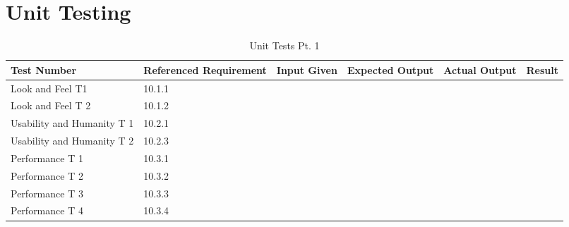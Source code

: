 \documentclass[12pt, titlepage]{article}
\begin{document}
\section{Unit Testing}
\noindent
{}

\begin{table}[!h]
\caption{Unit Tests Pt. 1}
\begin{adjustwidth}{-2cm}{-2cm}
\begin{tabularx}{500pt}{|K|K|K|K|K|K|}
	\hline 
	\textbf{Test Number} & \textbf{Referenced Requirement} & \textbf{Input Given} & \textbf{Expected Output} & \textbf{Actual Output} & \textbf{Result} \\
	\hline 
	Look and Feel T1 & 10.1.1 &  &  &  &  \\
	\hline 
	Look and Feel T 2 & 10.1.2 &  &  &  &  \\
	\hline 
	Usability and Humanity T 1 & 10.2.1 &  &  &  &  \\
	\hline 
	Usability and Humanity T 2 & 10.2.3 &  &  &  &  \\
	\hline 
	Performance T 1 & 10.3.1 &  &  &  &  \\
	\hline 
	Performance T 2 & 10.3.2 &  &  &  &  \\
	\hline 
	Performance T 3 & 10.3.3 &  &  &  &  \\
	\hline 
	Performance T 4 & 10.3.4 &  &  &  &  \\
	\hline
\end{tabularx}
\end{adjustwidth}	
\end{table}
	
\end{document}

